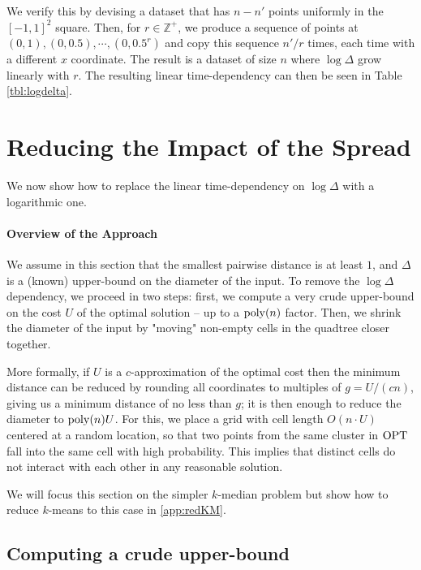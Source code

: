 We verify this by devising a dataset that has $n - n'$ points uniformly in the $[-1, 1]^2$ square. Then, for $r \in \mathbb{Z}^+$, we produce a sequence of
points at $(0, 1), (0, 0.5), \cdots, (0, 0.5^r)$ and copy this sequence $n' / r$ times, each time with a different $x$ coordinate. The result is a dataset of
size $n$ where $\log \Delta$ grow linearly with $r$. The resulting linear time-dependency can then be seen in Table \ref{tbl:logdelta}.



\section{Reducing the Impact of the Spread}
\label{sec:theory} %
\newcommand{\boxsize}{\textsc{MaxDist}}
We now show how to replace the linear time-dependency on $\log \Delta$ with a logarithmic one.

\paragraph*{Overview of the Approach}

We assume in this section that the smallest pairwise distance is at least $1$, and $\Delta$ is a (known) upper-bound on the diameter of the input.  To remove
the $\log\Delta$ dependency, we proceed in two steps: first, we compute a very crude upper-bound on the cost $U$ of the optimal solution -- up to a $\operatorname{poly}(n)$
factor. Then, we shrink the diameter of the input by "moving" non-empty cells in the quadtree closer together.

More formally, if $U$ is a $c$-approximation of the optimal cost then the minimum distance can be reduced by rounding all coordinates to multiples of $g = U/(cn)$,
giving us a minimum distance of no less than $g$; it is then enough to reduce the diameter to $\operatorname{poly}(n) U$.  For this, we place a grid with cell length $O(n
\cdot U)$ centered at a random location, so that two points from the same cluster in $\text{OPT}$ fall into the same cell with high probability. This implies that
distinct cells do not interact with each other in any reasonable solution.

 We will focus this section on the simpler $k$-median problem but
show how to reduce $k$-means to this case in \cref{app:redKM}.


\subsection{Computing a crude upper-bound}
\label{ssec:crude_bound}

